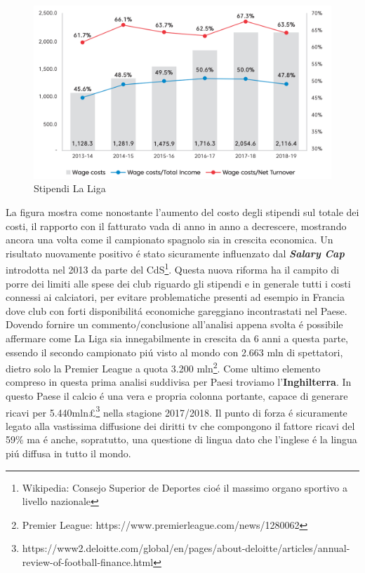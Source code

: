 \documentclass[
    corpo=12pt,
    oneside,
    evenboxes,
    tipotesi=triennale,
    stile=classica,
    oldstyle,
    autoretitolo,
    greek,
]{toptesi}
\begin{document}
\begin{interlinea}{1.5}
\begin{figure}
    \includegraphics[scale=.5]{img/wage_spain.png}
    \caption{Stipendi La Liga}
    \label{wage_spain}
\end{figure}
La figura mostra come nonostante l'aumento del costo degli stipendi sul totale dei costi, il rapporto con il fatturato vada di anno in anno
a decrescere, mostrando ancora una volta come il campionato spagnolo sia in crescita economica. Un risultato nuovamente positivo \'e stato
sicuramente influenzato dal \emph{\textbf{Salary Cap}} introdotta nel 2013 da parte del CdS\footnote{Wikipedia: Consejo Superior de Deportes cio\'e il massimo organo sportivo a livello nazionale}.
Questa nuova riforma ha il campito di porre dei limiti alle spese dei club riguardo gli stipendi e in generale tutti i costi connessi ai calciatori,
per evitare problematiche presenti ad esempio in Francia dove club con forti disponibilit\'a economiche gareggiano incontrastati nel Paese.\newline
Dovendo fornire un commento/conclusione all'analisi appena svolta \'e possibile affermare come La Liga sia innegabilmente in crescita da 6 
anni a questa parte, essendo il secondo campionato pi\'u visto al mondo con 2.663 mln di spettatori, dietro solo la Premier League a quota 
3.200 mln\footnote{Premier League: https://www.premierleague.com/news/1280062}.\newline
Come ultimo elemento compreso in questa prima analisi suddivisa per Paesi troviamo l'\textbf{Inghilterra}. In questo Paese il calcio 
\'e una vera e propria colonna portante, capace di generare ricavi per 5.440mln£\footnote{https://www2.deloitte.com/global/en/pages/about-deloitte/articles/annual-review-of-football-finance.html}
nella stagione 2017/2018. Il punto di forza \'e sicuramente legato alla vastissima diffusione dei diritti tv che compongono il fattore ricavi
del 59\% ma \'e anche, sopratutto, una questione di lingua dato che l'inglese \'e la lingua pi\'u diffusa in tutto il mondo.\newline

\end{interlinea}
\end{document}
